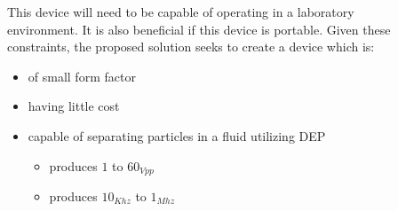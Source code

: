 \documentclass[25pt, a0paper, portrait, margin=0mm, innermargin=15mm, blockverticalspace=15mm, colspace=15mm, subcolspace=8mm]{tikzposter}
\begin{document}
\begin{columns}
{%
}



{
\begin{multicols}{2}

This device will need to be capable of operating in a laboratory environment.
It is also beneficial if this device is portable.
%
Given these constraints, the proposed solution seeks to create a device which is:

\newpage

\begin{itemize}
\item of small form factor
\item having little cost
\item capable of separating particles in a fluid utilizing DEP
  \begin{itemize}
  \item produces $1$ to $60_{Vpp}$
  \item produces $10_{Khz}$ to $1_{Mhz}$
  \end{itemize}
\end{itemize}

\end{multicols}
}

{
\begin{multicols}{2}


\end{multicols}}
\end{columns}
\end{document}
